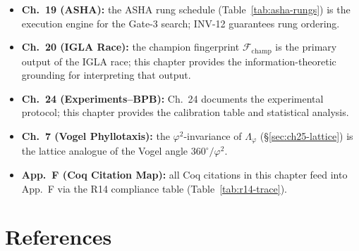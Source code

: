 \begin{itemize}
  \item \textbf{Ch.~19 (ASHA):} the ASHA rung schedule
    (Table~\ref{tab:asha-rungs}) is the execution engine for the
    Gate-3 search; INV-12 guarantees rung ordering.
  \item \textbf{Ch.~20 (IGLA Race):} the champion fingerprint
    $\mathcal{F}_{\mathrm{champ}}$ is the primary output of the IGLA
    race; this chapter provides the information-theoretic grounding
    for interpreting that output.
  \item \textbf{Ch.~24 (Experiments–BPB):} Ch.~24 documents the
    experimental protocol; this chapter provides the calibration
    table and statistical analysis.
  \item \textbf{Ch.~7 (Vogel Phyllotaxis):} the $\varphi^2$-invariance
    of $\Lambda_\varphi$ (§\ref{sec:ch25-lattice}) is the lattice
    analogue of the Vogel angle $360^\circ/\varphi^2$.
  \item \textbf{App.~F (Coq Citation Map):} all Coq citations in this
    chapter feed into App.~F via the R14 compliance table
    (Table~\ref{tab:r14-trace}).
\end{itemize}

\section{References}
\label{sec:ch25-references}

